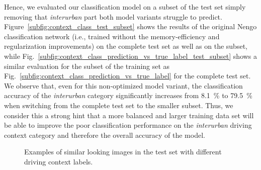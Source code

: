 Hence, we evaluated our classification model on a subset of the test set simply removing that \emph{interurban} part both model variants struggle to predict.
Figure~\ref{subfig:context_class_test_subset} shows the results of the original \ac{Nengo} classification network (i.e., trained without the memory-efficiency and regularization improvements) on the complete test set as well as on the subset, while Fig.~\ref{subfig:context_class_prediction_vs_true_label_test_subset} shows a similar evaluation for the subset of the training set as Fig.~\ref{subfig:context_class_prediction_vs_true_label} for the complete test set.
We observe that, even for this non-optimized model variant, the classification accuracy of the \emph{interurban} category significantly increases from \SI{8.1}{\percent} to \SI{79.5}{\percent} when switching from the complete test set to the smaller subset.
Thus, we consider this a strong hint that a more balanced and larger training data set will be able to improve the poor classification performance on the \emph{interurban} driving context category and therefore the overall accuracy of the model.

\begin{figure}[t]
    \centering
    \caption{Examples of similar looking images in the test set with different driving context labels. }
    \label{fig:context_class_similar_image_examples}
\end{figure}

